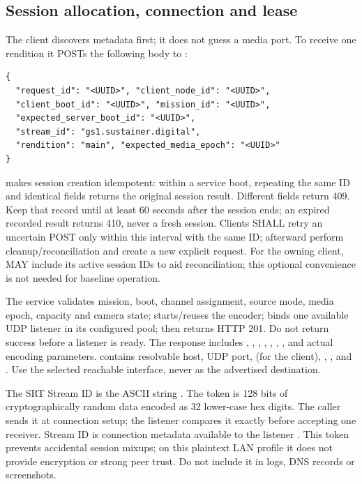 \subsection{Session allocation, connection and lease}
The client discovers metadata first; it does not guess a media port. To receive
one rendition it POSTs the following body to :
\begin{lstlisting}
{
  "request_id": "<UUID>", "client_node_id": "<UUID>",
  "client_boot_id": "<UUID>", "mission_id": "<UUID>",
  "expected_server_boot_id": "<UUID>",
  "stream_id": "gs1.sustainer.digital",
  "rendition": "main", "expected_media_epoch": "<UUID>"
}
\end{lstlisting}
 makes session creation idempotent: within a service boot,
repeating the same ID and identical fields returns the original session result.
Different fields return 409. Keep that record until at least 60 seconds after
the session ends; an expired recorded result returns 410, never a fresh session.
Clients SHALL retry an uncertain POST only within this interval with the same ID;
afterward perform cleanup/reconciliation and create a new explicit request.
For the owning client,  MAY include its active session IDs to aid
reconciliation; this optional convenience is not needed for baseline operation.

The service validates mission, boot, channel assignment, source mode, media epoch,
capacity and camera state; starts/reuses the encoder; binds one available UDP
listener in its configured pool; then returns HTTP 201. Do not return success
before a listener is ready. The response includes ,
, , ,
, , ,
 and actual encoding parameters.  contains
resolvable host, UDP port,  (for the client),
, ,  and
. Use the selected reachable interface, never 
as the advertised destination.

The SRT Stream ID is the ASCII string .
The token is 128 bits of cryptographically random data encoded as 32 lower-case
hex digits. The caller sends it at connection setup; the listener compares it
exactly before accepting one receiver. Stream ID is connection metadata available
to the listener \cite{srtoptions}. This token prevents accidental session mixups;
on this plaintext LAN profile it does not provide encryption or strong peer trust.
Do not include it in logs, DNS records or screenshots.

